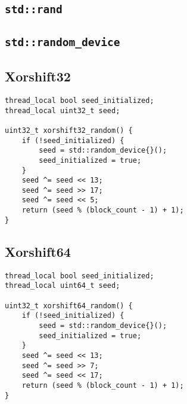     

\subsection[\lstinline{std::rand}]{\lstinline{std::rand}} \label{subsec:rand}

    

\subsection[\lstinline{std::random_device}]{\lstinline{std::random_device}} \label{subsec:random_device}

    

\subsection[Xorshift32]{Xorshift32} \label{subsec:xorshift32}

\begin{@empty}
    \lstset{
        language = [ISO]C++,
        style = basic
    }
    \begin{lstlisting}
thread_local bool seed_initialized;
thread_local uint32_t seed;

uint32_t xorshift32_random() {
    if (!seed_initialized) {
        seed = std::random_device{}();
        seed_initialized = true;
    }
    seed ^= seed << 13;
    seed ^= seed >> 17;
    seed ^= seed << 5;
    return (seed % (block_count - 1) + 1);
}
    \end{lstlisting}
\end{@empty}

\subsection[Xorshift64]{Xorshift64} \label{subsec:xorshift64}

\begin{@empty}
    \lstset{
        language = [ISO]C++,
        style = basic
    }
    \begin{lstlisting}
thread_local bool seed_initialized;
thread_local uint64_t seed;

uint32_t xorshift64_random() {
    if (!seed_initialized) {
        seed = std::random_device{}();
        seed_initialized = true;
    }
    seed ^= seed << 13;
    seed ^= seed >> 7;
    seed ^= seed << 17;
    return (seed % (block_count - 1) + 1);
}
    \end{lstlisting}
\end{@empty}


